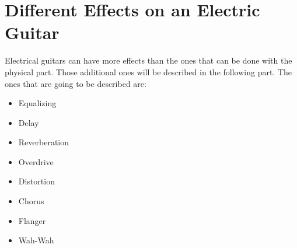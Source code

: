 

\section{Different Effects on an Electric Guitar} \label{sec:effects}

Electrical guitars can have more effects than the ones that can be done with the physical part. Those additional ones will be described in the following part. The ones that are going to be described are:

\begin{itemize}
 \item Equalizing
 \item Delay
 \item Reverberation
 \item Overdrive
 \item Distortion
 \item Chorus
 \item Flanger
 \item Wah-Wah
\end{itemize}


\label{sec:equalizing} 
\label{sec:delay} 
\label{sec:reverberation} 
\label{sec:overdrive} 
\label{sec:chorus} 
\label{sec:wah-wah} 
